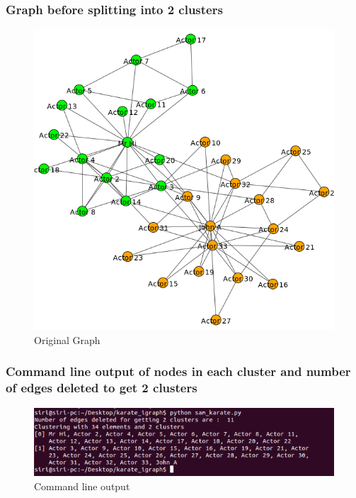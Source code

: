 \subsubsection{Graph before splitting into 2 clusters}
\begin{figure}[ht]    
    \begin{center}
        \includegraphics[scale=0.7]{group1.png}
        \caption{Original Graph}
        \label{g2}
    \end{center}
\end{figure}
\newpage
\subsubsection{Command line output of nodes in each cluster and number of edges deleted to get 2 clusters}
\begin{figure}[ht]    
    \begin{center}
        \includegraphics[scale=1.0]{cmd_1.png}
        \caption{Command line output}
        \label{g3}
    \end{center}
\end{figure}
